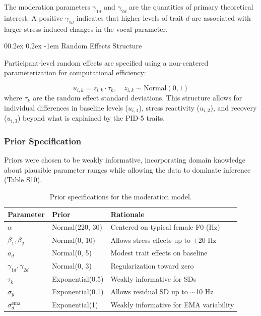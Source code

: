 \documentclass[
  english,
  man,floatsintext]{apa6}
\makeatletter
\let\oldparagraph\paragraph
\renewcommand{\paragraph}{
    \@ifstar
      \xxxParagraphStar
      \xxxParagraphNoStar
  }
\newcommand{\xxxParagraphStar}[1]{\oldparagraph*{#1}\mbox{}}
\newcommand{\xxxParagraphNoStar}[1]{\oldparagraph{#1}\mbox{}}
\renewcommand{\paragraph}{\@startsection{paragraph}{4}{\parindent}%
  {0\baselineskip \@plus 0.2ex \@minus 0.2ex}%
  {-1em}%
  {\normalfont\normalsize\bfseries\itshape\typesectitle}}
\makeatother
\begin{document}
The moderation parameters \(\gamma_{1d}\) and \(\gamma_{2d}\) are the quantities of primary theoretical interest. A positive \(\gamma_{1d}\) indicates that higher levels of trait \(d\) are associated with larger stress-induced changes in the vocal parameter.

\paragraph{Random Effects Structure}\label{random-effects-structure}

Participant-level random effects are specified using a non-centered parameterization for computational efficiency:

\[
u_{i,k} = z_{i,k} \cdot \tau_k, \quad z_{i,k} \sim \text{Normal}(0, 1)
\]
where \(\tau_k\) are the random effect standard deviations. This structure allows for individual differences in baseline levels (\(u_{i,1}\)), stress reactivity (\(u_{i,2}\)), and recovery (\(u_{i,3}\)) beyond what is explained by the PID-5 traits.

\subsubsection{Prior Specification}\label{prior-specification-1}

Priors were chosen to be weakly informative, incorporating domain knowledge about plausible parameter ranges while allowing the data to dominate inference (Table S10).

\begin{table}

\caption{\label{tab:table-s9-priors-moderation}Prior specifications for the moderation model.}
\centering
\begin{tabular}[t]{lll}
\toprule
Parameter & Prior & Rationale\\
\midrule
$\alpha$ & Normal(220, 30) & Centered on typical female F0 (Hz)\\
$\beta_1, \beta_2$ & Normal(0, 10) & Allows stress effects up to $\pm$20 Hz\\
$a_d$ & Normal(0, 5) & Modest trait effects on baseline\\
$\gamma_{1d}, \gamma_{2d}$ & Normal(0, 3) & Regularization toward zero\\
$\tau_k$ & Exponential(0.5) & Weakly informative for SDs\\
\addlinespace
$\sigma_y$ & Exponential(0.1) & Allows residual SD up to $\sim$10 Hz\\
$\sigma_d^{\text{ema}}$ & Exponential(1) & Weakly informative for EMA variability\\
\bottomrule
\end{tabular}
\end{table}
\end{document}
